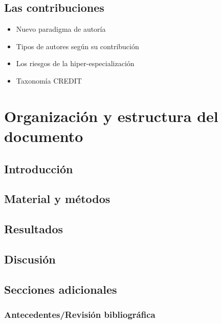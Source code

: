 \documentclass[
]{book}
\providecommand{\tightlist}{%
  \setlength{\itemsep}{0pt}\setlength{\parskip}{0pt}}
\begin{document}
\hypertarget{las-contribuciones}{%
\section{Las contribuciones}\label{las-contribuciones}}

\begin{itemize}
\tightlist
\item
  Nuevo paradigma de autoría
\item
  Tipos de autores según su contribución
\item
  Los riesgos de la hiper-especialización
\item
  Taxonomía CREDIT
\end{itemize}

\hypertarget{organizaciuxf3n-y-estructura-del-documento}{%
\chapter{Organización y estructura del documento}\label{organizaciuxf3n-y-estructura-del-documento}}

\hypertarget{introducciuxf3n}{%
\section{Introducción}\label{introducciuxf3n}}

\hypertarget{material-y-muxe9todos}{%
\section{Material y métodos}\label{material-y-muxe9todos}}

\hypertarget{resultados}{%
\section{Resultados}\label{resultados}}

\hypertarget{discusiuxf3n}{%
\section{Discusión}\label{discusiuxf3n}}

\hypertarget{secciones-adicionales}{%
\section{Secciones adicionales}\label{secciones-adicionales}}

\hypertarget{antecedentesrevisiuxf3n-bibliogruxe1fica}{%
\subsection{Antecedentes/Revisión bibliográfica}\label{antecedentesrevisiuxf3n-bibliogruxe1fica}}
\end{document}
